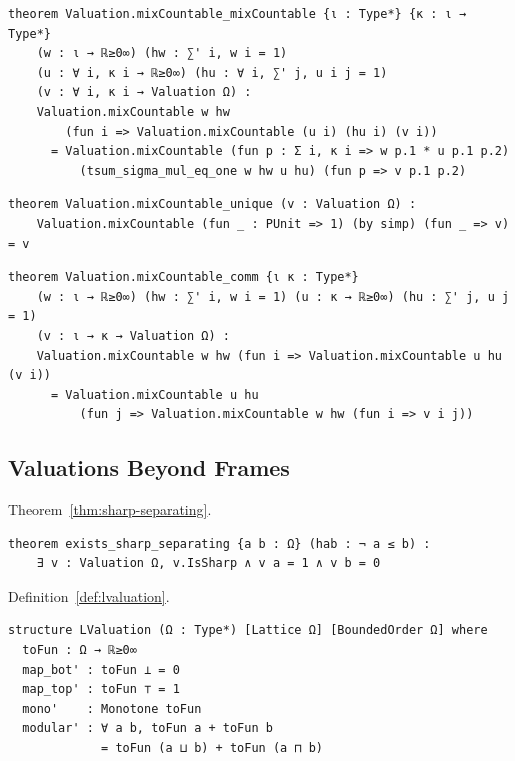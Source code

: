\label{lean:mixcountable-mixcountable}
\begin{lstlisting}
theorem Valuation.mixCountable_mixCountable {ι : Type*} {κ : ι → Type*}
    (w : ι → ℝ≥0∞) (hw : ∑' i, w i = 1)
    (u : ∀ i, κ i → ℝ≥0∞) (hu : ∀ i, ∑' j, u i j = 1)
    (v : ∀ i, κ i → Valuation Ω) :
    Valuation.mixCountable w hw
        (fun i => Valuation.mixCountable (u i) (hu i) (v i))
      = Valuation.mixCountable (fun p : Σ i, κ i => w p.1 * u p.1 p.2)
          (tsum_sigma_mul_eq_one w hw u hu) (fun p => v p.1 p.2)
\end{lstlisting}

\label{lean:mixcountable-unique}
\begin{lstlisting}
theorem Valuation.mixCountable_unique (v : Valuation Ω) :
    Valuation.mixCountable (fun _ : PUnit => 1) (by simp) (fun _ => v) = v
\end{lstlisting}

\label{lean:mixcountable-comm}
\begin{lstlisting}
theorem Valuation.mixCountable_comm {ι κ : Type*}
    (w : ι → ℝ≥0∞) (hw : ∑' i, w i = 1) (u : κ → ℝ≥0∞) (hu : ∑' j, u j = 1)
    (v : ι → κ → Valuation Ω) :
    Valuation.mixCountable w hw (fun i => Valuation.mixCountable u hu (v i))
      = Valuation.mixCountable u hu
          (fun j => Valuation.mixCountable w hw (fun i => v i j))
\end{lstlisting}

\subsection{Valuations Beyond Frames}

\noindent Theorem~\ref{thm:sharp-separating}.
\label{lean:sharp-separating}
\begin{lstlisting}
theorem exists_sharp_separating {a b : Ω} (hab : ¬ a ≤ b) :
    ∃ v : Valuation Ω, v.IsSharp ∧ v a = 1 ∧ v b = 0
\end{lstlisting}

\noindent Definition~\ref{def:lvaluation}.
\label{lean:lvaluation}
\begin{lstlisting}
structure LValuation (Ω : Type*) [Lattice Ω] [BoundedOrder Ω] where
  toFun : Ω → ℝ≥0∞
  map_bot' : toFun ⊥ = 0
  map_top' : toFun ⊤ = 1
  mono'    : Monotone toFun
  modular' : ∀ a b, toFun a + toFun b
             = toFun (a ⊔ b) + toFun (a ⊓ b)
\end{lstlisting}


